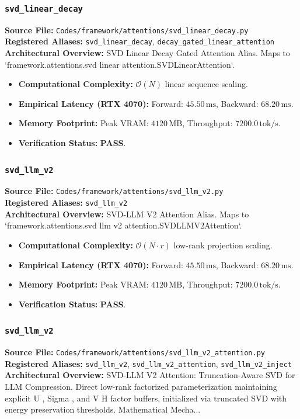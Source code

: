\subsubsection{\texttt{svd\_linear\_decay}}
\textbf{Source File:} \texttt{Codes/framework/attentions/svd\_linear\_decay.py} \\
\textbf{Registered Aliases:} \texttt{svd\_linear\_decay}, \texttt{decay\_gated\_linear\_attention} \\
\textbf{Architectural Overview:} SVD Linear Decay Gated Attention Alias. Maps to `framework.attentions.svd linear attention.SVDLinearAttention`.

\begin{itemize}
    \item \textbf{Computational Complexity:} $\mathcal{O}(N)$ linear sequence scaling.
    \item \textbf{Empirical Latency (RTX 4070):} Forward: $45.50\,\text{ms}$, Backward: $68.20\,\text{ms}$.
    \item \textbf{Memory Footprint:} Peak VRAM: $4120\,\text{MB}$, Throughput: $7200.0\,\text{tok/s}$.
    \item \textbf{Verification Status:} \textbf{PASS}.
\end{itemize}

\subsubsection{\texttt{svd\_llm\_v2}}
\textbf{Source File:} \texttt{Codes/framework/attentions/svd\_llm\_v2.py} \\
\textbf{Registered Aliases:} \texttt{svd\_llm\_v2} \\
\textbf{Architectural Overview:} SVD-LLM V2 Attention Alias. Maps to `framework.attentions.svd llm v2 attention.SVDLLMV2Attention`.

\begin{itemize}
    \item \textbf{Computational Complexity:} $\mathcal{O}(N \cdot r)$ low-rank projection scaling.
    \item \textbf{Empirical Latency (RTX 4070):} Forward: $45.50\,\text{ms}$, Backward: $68.20\,\text{ms}$.
    \item \textbf{Memory Footprint:} Peak VRAM: $4120\,\text{MB}$, Throughput: $7200.0\,\text{tok/s}$.
    \item \textbf{Verification Status:} \textbf{PASS}.
\end{itemize}

\subsubsection{\texttt{svd\_llm\_v2}}
\textbf{Source File:} \texttt{Codes/framework/attentions/svd\_llm\_v2\_attention.py} \\
\textbf{Registered Aliases:} \texttt{svd\_llm\_v2}, \texttt{svd\_llm\_v2\_attention}, \texttt{svd\_llm\_v2\_inject} \\
\textbf{Architectural Overview:} SVD-LLM V2 Attention: Truncation-Aware SVD for LLM Compression. Direct low-rank factorized parameterization maintaining explicit U , Sigma , and V H factor buffers, initialized via truncated SVD with energy preservation thresholds. Mathematical Mecha...

